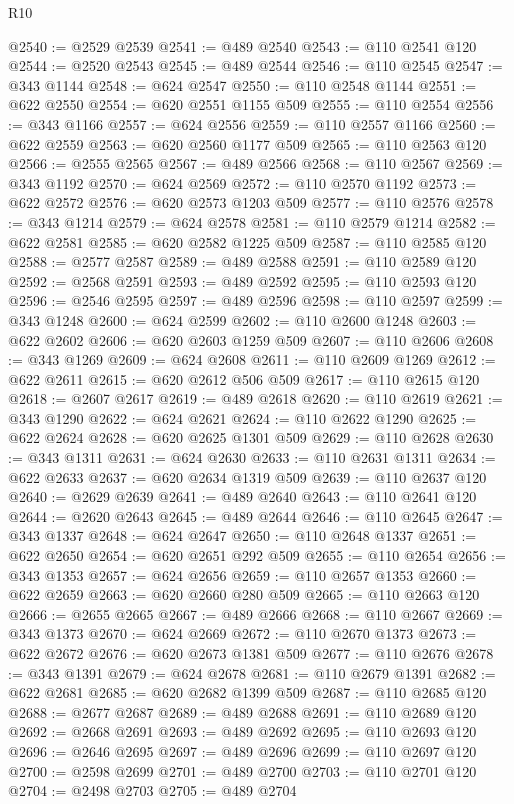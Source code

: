 \begin{lexlean}{R10}
\begin{coremodule}
{{{{{{{{{{{{{{{{{{{{{{{{{{{{{{{{{{{{{{{{{{{{{{{{{{{{{{{{{{{{{{{{{{{{{{{{{{{{{{{{{{{{@2540 := @2529 @2539
@2541 := @489 @2540
@2543 := @110 @2541 @120
@2544 := @2520 @2543
@2545 := @489 @2544
@2546 := @110 @2545
@2547 := @343 @1144
@2548 := @624 @2547
@2550 := @110 @2548 @1144
@2551 := @622 @2550
@2554 := @620 @2551 @1155 @509
@2555 := @110 @2554
@2556 := @343 @1166
@2557 := @624 @2556
@2559 := @110 @2557 @1166
@2560 := @622 @2559
@2563 := @620 @2560 @1177 @509
@2565 := @110 @2563 @120
@2566 := @2555 @2565
@2567 := @489 @2566
@2568 := @110 @2567
@2569 := @343 @1192
@2570 := @624 @2569
@2572 := @110 @2570 @1192
@2573 := @622 @2572
@2576 := @620 @2573 @1203 @509
@2577 := @110 @2576
@2578 := @343 @1214
@2579 := @624 @2578
@2581 := @110 @2579 @1214
@2582 := @622 @2581
@2585 := @620 @2582 @1225 @509
@2587 := @110 @2585 @120
@2588 := @2577 @2587
@2589 := @489 @2588
@2591 := @110 @2589 @120
@2592 := @2568 @2591
@2593 := @489 @2592
@2595 := @110 @2593 @120
@2596 := @2546 @2595
@2597 := @489 @2596
@2598 := @110 @2597
@2599 := @343 @1248
@2600 := @624 @2599
@2602 := @110 @2600 @1248
@2603 := @622 @2602
@2606 := @620 @2603 @1259 @509
@2607 := @110 @2606
@2608 := @343 @1269
@2609 := @624 @2608
@2611 := @110 @2609 @1269
@2612 := @622 @2611
@2615 := @620 @2612 @506 @509
@2617 := @110 @2615 @120
@2618 := @2607 @2617
@2619 := @489 @2618
@2620 := @110 @2619
@2621 := @343 @1290
@2622 := @624 @2621
@2624 := @110 @2622 @1290
@2625 := @622 @2624
@2628 := @620 @2625 @1301 @509
@2629 := @110 @2628
@2630 := @343 @1311
@2631 := @624 @2630
@2633 := @110 @2631 @1311
@2634 := @622 @2633
@2637 := @620 @2634 @1319 @509
@2639 := @110 @2637 @120
@2640 := @2629 @2639
@2641 := @489 @2640
@2643 := @110 @2641 @120
@2644 := @2620 @2643
@2645 := @489 @2644
@2646 := @110 @2645
@2647 := @343 @1337
@2648 := @624 @2647
@2650 := @110 @2648 @1337
@2651 := @622 @2650
@2654 := @620 @2651 @292 @509
@2655 := @110 @2654
@2656 := @343 @1353
@2657 := @624 @2656
@2659 := @110 @2657 @1353
@2660 := @622 @2659
@2663 := @620 @2660 @280 @509
@2665 := @110 @2663 @120
@2666 := @2655 @2665
@2667 := @489 @2666
@2668 := @110 @2667
@2669 := @343 @1373
@2670 := @624 @2669
@2672 := @110 @2670 @1373
@2673 := @622 @2672
@2676 := @620 @2673 @1381 @509
@2677 := @110 @2676
@2678 := @343 @1391
@2679 := @624 @2678
@2681 := @110 @2679 @1391
@2682 := @622 @2681
@2685 := @620 @2682 @1399 @509
@2687 := @110 @2685 @120
@2688 := @2677 @2687
@2689 := @489 @2688
@2691 := @110 @2689 @120
@2692 := @2668 @2691
@2693 := @489 @2692
@2695 := @110 @2693 @120
@2696 := @2646 @2695
@2697 := @489 @2696
@2699 := @110 @2697 @120
@2700 := @2598 @2699
@2701 := @489 @2700
@2703 := @110 @2701 @120
@2704 := @2498 @2703
@2705 := @489 @2704
}}}}}}}}}}}}}}}}}}}}}}}}}}}}}}}}}}}}}}}}}}}}}}}}}}}}}}}}}}}}}}}}}}}}}}}}}}}}}}}}}}}}
\end{coremodule}
\end{lexlean}
